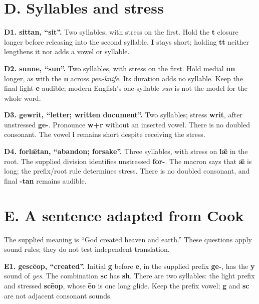 \section*{D. Syllables and stress}

\textbf{D1. sittan, “sit”.} Two syllables, with stress on the first. Hold the \textbf{t} closure longer before releasing into the second syllable. \textbf{I} stays short; holding \textbf{tt} neither lengthens it nor adds a vowel or syllable.

\textbf{D2. sunne, “sun”.} Two syllables, with stress on the first. Hold medial \textbf{nn} longer, as with the \textbf{n} across \emph{pen-knife}. Its duration adds no syllable. Keep the final light \textbf{e} audible; modern English's one-syllable \emph{sun} is not the model for the whole word.

\textbf{D3. gewrit, “letter; written document”.} Two syllables; stress \textbf{writ}, after unstressed \textbf{ge-}. Pronounce \textbf{w+r} without an inserted vowel. There is no doubled consonant. The vowel \textbf{i} remains short despite receiving the stress.

\textbf{D4. forlǣtan, “abandon; forsake”.} Three syllables, with stress on \textbf{lǣ} in the root. The supplied division identifies unstressed \textbf{for-}. The macron says that \textbf{ǣ} is long; the prefix/\allowbreak{}root rule determines stress. There is no doubled consonant, and final \textbf{-tan} remains audible.

\section*{E. A sentence adapted from Cook}

The supplied meaning is “God created heaven and earth.” These questions apply sound rules; they do not test independent translation.

\textbf{E1. gescēop, “created”.} Initial \textbf{g} before \textbf{e}, in the supplied prefix \textbf{ge-}, has the \textbf{y} sound of \emph{yes}. The combination \textbf{sc} has \textbf{sh}. There are two syllables: the light prefix and stressed \textbf{scēop}, whose \textbf{ēo} is one long glide. Keep the prefix vowel; \textbf{g} and \textbf{sc} are not adjacent consonant sounds.

